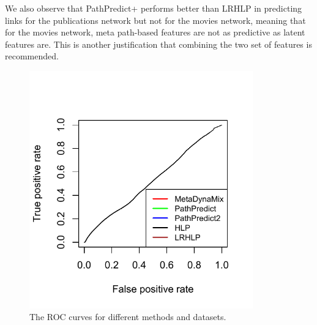 We also observe that PathPredict+ performs better than LRHLP in predicting links for the publications network but not for the movies network, meaning that for the movies network, meta path-based features are not as predictive as latent features are. This is another justification that combining the two set of features is recommended.




\begin{figure}[t]
\centering
\includegraphics[trim = 0mm 10mm 0mm 0mm,width=0.86\textwidth]{figs/ROC.pdf}
\caption{The ROC curves for different methods and datasets.} \label{fig:auc}
\end{figure}




